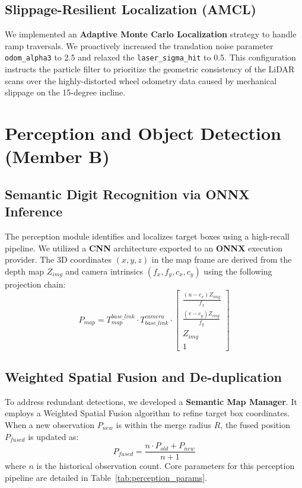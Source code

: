 \documentclass[11pt, a4paper]{article}
\begin{document}
\subsection{Slippage-Resilient Localization (AMCL)}
We implemented an \textbf{Adaptive Monte Carlo Localization} strategy to handle ramp traversals. We proactively increased the translation noise parameter \texttt{odom\_alpha3} to 2.5 and relaxed the \texttt{laser\_sigma\_hit} to 0.5. This configuration instructs the particle filter to prioritize the geometric consistency of the LiDAR scans over the highly-distorted wheel odometry data caused by mechanical slippage on the 15-degree incline.

\section{Perception and Object Detection (Member B)}
\subsection{Semantic Digit Recognition via ONNX Inference}
The perception module identifies and localizes target boxes using a high-recall pipeline. We utilized a \textbf{CNN} architecture exported to an \textbf{ONNX} execution provider. The 3D coordinates $(x, y, z)$ in the map frame are derived from the depth map $Z_{img}$ and camera intrinsics $(f_x, f_y, c_x, c_y)$ using the following projection chain:
\begin{equation}
    P_{map} = T_{map}^{base\_link} \cdot T_{base\_link}^{camera} \cdot \begin{bmatrix} \frac{(u - c_x) Z_{img}}{f_x} \\ \frac{(v - c_y) Z_{img}}{f_y} \\ Z_{img} \\ 1 \end{bmatrix}
\end{equation}

\subsection{Weighted Spatial Fusion and De-duplication}
To address redundant detections, we developed a \textbf{Semantic Map Manager}. It employs a Weighted Spatial Fusion algorithm to refine target box coordinates. When a new observation $P_{new}$ is within the merge radius $R$, the fused position $P_{fused}$ is updated as:
\begin{equation}
    P_{fused} = \frac{n \cdot P_{old} + P_{new}}{n + 1}
\end{equation}
where $n$ is the historical observation count. Core parameters for this perception pipeline are detailed in Table~\ref{tab:perception_params}.
\end{document}
